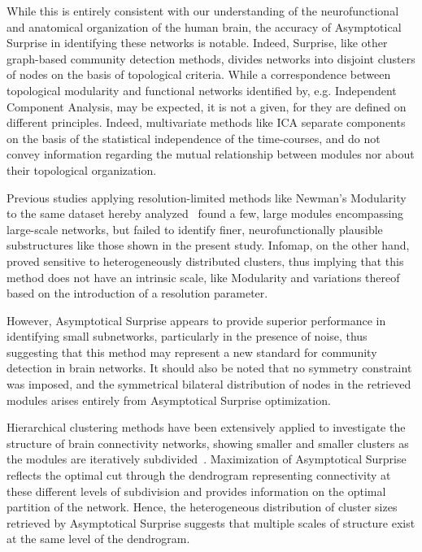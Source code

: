 While this is entirely consistent with our understanding of the neurofunctional and anatomical organization of the human brain, the accuracy of Asymptotical Surprise in identifying these networks is notable.
Indeed, Surprise, like other graph-based community detection methods, divides networks into disjoint clusters of nodes on the basis of topological criteria.
While a correspondence between topological modularity and functional networks identified by, e.g.
Independent Component Analysis, may be expected, it is not a given, for they are defined on different principles.
Indeed, multivariate methods like ICA separate components on the basis of the statistical independence of the time-courses, and do not convey information regarding the mutual relationship between modules nor about their topological organization.

Previous studies applying resolution-limited methods like Newman's Modularity to the same dataset hereby analyzed~\cite{crossley2013a} found a few, large modules encompassing large-scale networks, but failed to identify finer, neurofunctionally plausible substructures like those shown in the present study.
Infomap, on the other hand, proved sensitive to heterogeneously distributed clusters, thus implying that this method does not have an intrinsic scale, like Modularity and variations thereof based on the introduction of a resolution parameter.

However, Asymptotical Surprise appears to provide superior performance in identifying small subnetworks, particularly in the presence of noise, thus suggesting that this method may represent a new standard for community detection in brain networks.
It should also be noted that no symmetry constraint was imposed, and the symmetrical bilateral distribution of nodes in the retrieved modules arises entirely from Asymptotical Surprise optimization.


Hierarchical clustering methods have been extensively applied to investigate the structure of brain connectivity networks, showing smaller and smaller clusters as the modules are iteratively subdivided~\cite{meunier2010}.
Maximization of Asymptotical Surprise reflects the optimal cut through the dendrogram representing connectivity at these different levels of subdivision and provides information on the optimal partition of the network.
Hence, the heterogeneous distribution of cluster sizes retrieved by Asymptotical Surprise suggests that multiple scales of structure exist at the same level of the dendrogram.

